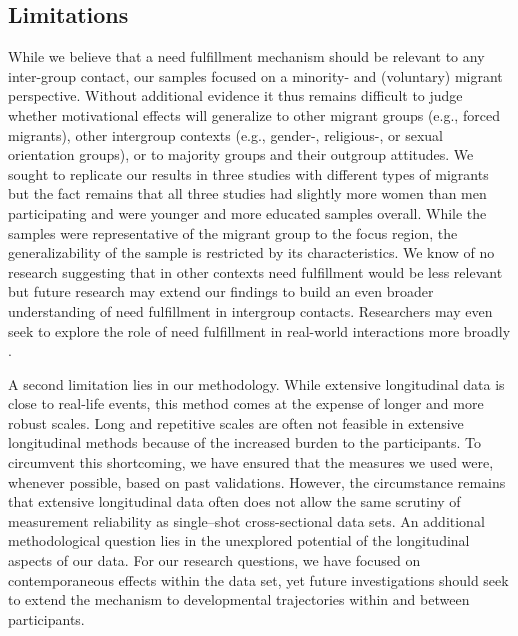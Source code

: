 \documentclass[man, 12pt, a4paper, mask]{apa7}
\theoremstyle{break}
\theoremstyle{plain}
\begin{document}
\subsection{Limitations}
While we believe that a need fulfillment mechanism should be relevant to any inter-group contact, our samples focused on a minority- and (voluntary) migrant perspective. Without additional evidence it thus remains difficult to judge whether motivational effects will generalize to other migrant groups (e.g., forced migrants), other intergroup contexts (e.g., gender-, religious-, or sexual orientation groups), or to majority groups and their outgroup attitudes. We sought to replicate our results in three studies with different types of migrants but the fact remains that all three studies had slightly more women than men participating and were younger and more educated samples overall. While the samples were representative of the migrant group to the focus region, the generalizability of the sample is restricted by its characteristics. We know of no research suggesting that in other contexts need fulfillment would be less relevant but future research may extend our findings to build an even broader understanding of need fulfillment in intergroup contacts. Researchers may even seek to explore the role of need fulfillment in real-world interactions more broadly \citep[also see][]{Downie2008}.

A second limitation lies in our methodology. While extensive longitudinal data is close to real-life events, this method comes at the expense of longer and more robust scales. Long and repetitive scales are often not feasible in extensive longitudinal methods because of the increased burden to the participants. To circumvent this shortcoming, we have ensured that the measures we used were, whenever possible, based on past validations. However, the circumstance remains that extensive longitudinal data often does not allow the same scrutiny of measurement reliability as single–shot cross-sectional data sets. An additional methodological question lies in the unexplored potential of the longitudinal aspects of our data. For our research questions, we have focused on contemporaneous effects within the data set, yet future investigations should seek to extend the mechanism to developmental trajectories within and between participants. 
\end{document}
